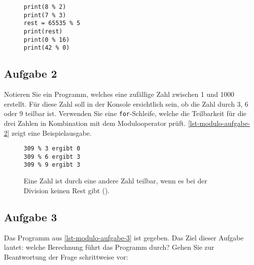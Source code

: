 \begin{figure}[htb]
\begin{minipage}{0.45\textwidth}
\fillwithgrid{1.5in}
\end{minipage}
\hfill
\begin{minipage}{0.45\textwidth}
\begin{lstlisting}[label={lst-modulo-aufgabe-1}, caption={Modulooperationen.}]
print(8 % 2)
print(7 % 3)
rest = 65535 % 5
print(rest)
print(0 % 16)
print(42 % 0)
\end{lstlisting}
\end{minipage}
\end{figure}

\subsection{Aufgabe 2}

Notieren Sie ein Programm, welches eine zufällige Zahl zwischen \num{1} und \num{1000} erstellt. Für diese Zahl soll in der Konsole ersichtlich sein, ob die Zahl durch \num{3}, \num{6} oder \num{9} teilbar ist. Verwenden Sie eine \lstinline{for}-Schleife, welche die Teilbarkeit für die drei Zahlen in Kombination mit dem Modulooperator prüft. \autoref{lst-modulo-aufgabe-2} zeigt eine Beispielausgabe.

\begin{figure}[htb]
\begin{minipage}{0.55\textwidth}
\fillwithgrid{3in}
\end{minipage}
\hfill
\begin{minipage}{0.4\textwidth}
\begin{lstlisting}[language=output, label={lst-modulo-aufgabe-2}, caption={Beispielausgabe.}]
309 % 3 ergibt 0
309 % 6 ergibt 3
309 % 9 ergibt 3
\end{lstlisting}
\begin{important}[Teilbarkeit]
Eine Zahl ist durch eine andere Zahl teilbar, wenn es bei der Division keinen Rest gibt ().
\end{important}
\end{minipage}
\end{figure}

\newpage

\subsection{Aufgabe 3}

Das Programm aus \autoref{lst-modulo-aufgabe-3} ist gegeben. Das Ziel dieser Aufgabe lautet: welche Berechnung führt das Programm durch? Gehen Sie zur Beantwortung der Frage schrittweise vor:

